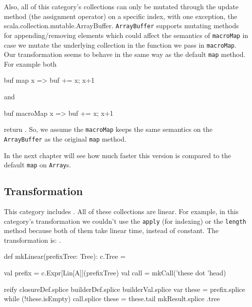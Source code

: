Also, all of this category's collections can only be mutated through the
update method (the assignment operator) on a specific index, with one
exception, the scala.\allowbreak{}collection.\allowbreak{}mutable.\allowbreak{}ArrayBuffer. 
\texttt{ArrayBuffer} supports mutating methods for appending/removing elements which could affect the
semantics of \texttt{macroMap} in case we mutate the underlying collection in the
function we pass in \texttt{macroMap}. Our transformation seems to behave in the same
way as the default \texttt{map} method. For example both

\begin{scalaCode}
buf map {x => buf += x; x+1 }
\end{scalaCode}

and

\begin{scalaCode}
buf macroMap { x => buf += x; x+1 }
\end{scalaCode}

return .
So, we assume the \texttt{macroMap} keeps the
same semantics on the \texttt{ArrayBuffer} as the original \texttt{map} method.

In the next chapter will see how much faster this version is compared to the
default \texttt{map} on \texttt{Array}s.

\subsection{ Transformation}

This category includes . All of these collections are linear.
For example, in this category's transformation we couldn't use the \texttt{apply} (for
indexing) or the \texttt{length} method because both of them take linear time, instead of
constant. The transformation is: .

\begin{scalaCode}
 def mkLinear(prefixTree: Tree): c.Tree = {
  val prefix = c.Expr[Lin[A]](prefixTree)
  val call   = mkCall('these dot 'head)

  reify {
    closureDef.splice
    builderDef.splice
    builderVal.splice
    var these = prefix.splice
    while (!these.isEmpty) {
      call.splice
      these = these.tail
    }
    mkResult.splice
  }.tree
}
\end{scalaCode}


